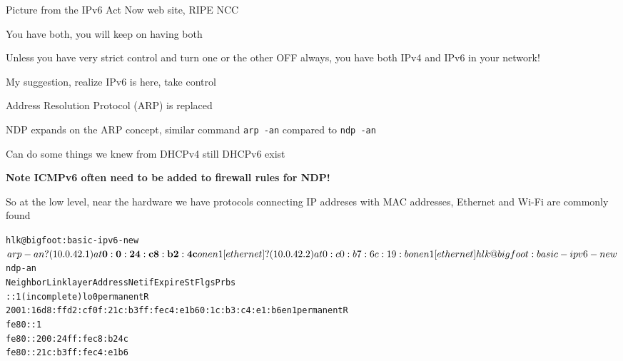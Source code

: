 \documentclass[Screen16to9,17pt]{foils}
\begin{document}

Picture from the IPv6 Act Now web site, RIPE NCC

\begin{list2}
\item You have both, you will keep on having both
\item Unless you have very strict control and turn one or the other OFF always, you have both IPv4 and IPv6 in your network!
\item My suggestion, realize IPv6 is here, take control
\end{list2}




\begin{list1}
\item Address Resolution Protocol (ARP) is replaced
\item NDP expands on the ARP concept, similar command \verb+arp -an+ compared to \verb+ndp -an+
\item Can do some things we knew from DHCPv4 still DHCPv6 exist
\item {\bf Note ICMPv6 often need to be added to firewall rules for NDP!} {\myalert}
\end{list1}


So at the low level, near the hardware we have protocols connecting IP addreses with MAC addresses, Ethernet and Wi-Fi are commonly found

\begin{alltt}
\small
hlk@bigfoot:basic-ipv6-new$ arp -an
? (10.0.42.1) at{\bf 0:0:24:c8:b2:4c} on en1 [ethernet]
? (10.0.42.2) at 0:c0:b7:6c:19:b on en1 [ethernet]

hlk@bigfoot:basic-ipv6-new$ ndp -an
Neighbor                      Linklayer Address  Netif Expire    St Flgs Prbs
::1                           (incomplete)         lo0 permanent R
2001:16d8:ffd2:cf0f:21c:b3ff:fec4:e1b6 0:1c:b3:c4:e1:b6 en1 permanent R
fe80::1%
fe80::200:24ff:fec8:b24c%
fe80::21c:b3ff:fec4:e1b6%
\end{alltt}

\end{document}
